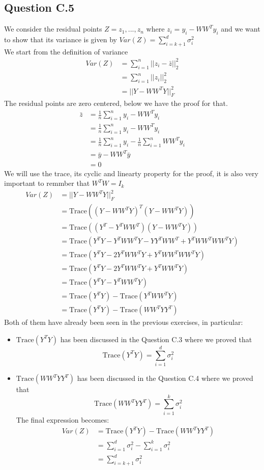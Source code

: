 \documentclass[a4paper]{scrartcl}
\newcommand{\tr}{\text{Trace}}
\begin{document}
\subsection*{Question C.5}
We consider the residual points $Z = {z_1 , . . . , z_n}$ where $z_i = y_i - WW^T y_i$ and we want to show that its variance is given by $Var(Z)= \sum_{i=k+1}^{d}\sigma_i^2$\\
We start from the definition of variance
\begin{align*}
    Var(Z) &= \sum_{i=1}^{n} || z_i - \bar{z}||_2^2\\
    &= \sum_{i=1}^{n} || z_i ||_2^2\\
    &= || Y - WW^TY||^2_F
\end{align*}
The residual points are zero centered, below we have the proof for that.
\begin{align*}
    \bar{z} &= \frac{1}{n} \sum_{i=1}^{n} y_i - W W^T y_i\\
    &= \frac{1}{n} \sum_{i=1}^{n} y_i - W W^T y_i\\
    &= \frac{1}{n} \sum_{i=1}^{n} y_i - \frac{1}{n} \sum_{i=1}^{n} W W^T y_i\\
    &= \bar{y} - W W^T \bar{y}\\
    &=0
\end{align*}
We will use the trace, its cyclic and linearty property for the proof, it is also very important to remmber that $W^T W = I_k$
\begin{align*}
    Var(Z) &= || Y - WW^TY||^2_F\\
    &= \tr((Y - WW^TY)^T (Y - WW^TY)) \\
    &= \tr((Y^T - Y^TWW^T) (Y - WW^TY))\\
    &= \tr(Y^T Y - Y^T WW^TY - Y Y^TWW^T + Y^TWW^T WW^TY)\\
    &= \tr(Y^T Y - 2Y^T WW^TY + Y^TWW^T WW^TY)\\
    &= \tr(Y^T Y - 2Y^T WW^TY + Y^TWW^TY)\\
    &= \tr(Y^T Y - Y^T WW^TY)\\
    &= \tr(Y^T Y) - \tr(Y^T WW^TY)\\
    &= \tr(Y^T Y) - \tr(WW^TY Y^T)
\end{align*}
Both of them have already been seen in the previous exercises, in particular:
\begin{itemize}
    \item $\tr(Y^T Y)$ has been discussed in the Question C.3 where we proved that
\[
\tr(Y^T Y)  = \sum_{i=1}^{d}\sigma_i^2
\]
    \item $\tr(WW^TY Y^T)$ has been discussed in the Question C.4 where we proved that
\[
\tr(WW^TY Y^T)  = \sum_{i=1}^{k}\sigma_i^2
\]
The final expression becomes:
\begin{align*}
Var(Z) &= \tr(Y^T Y) - \tr(WW^TY Y^T)\\
&= \sum_{i=1}^{d}\sigma_i^2 - \sum_{i=1}^{k}\sigma_i^2\\
&= \sum_{i=k+1}^{d}\sigma_i^2
\end{align*}
\end{itemize}
\end{document}
